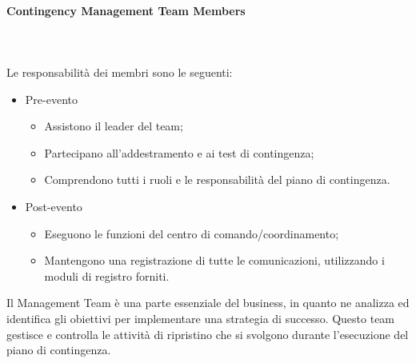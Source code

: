 \documentclass[12pt, a4paper, titlepage]{report}
\newcommand{\myparagraph}[1]{\paragraph{#1}\mbox{} \mbox{}}
\begin{document}
				\myparagraph{Contingency Management Team Members}\\
				\\Le responsabilità dei membri sono le seguenti:
				\begin{itemize}
					\item Pre-evento
					\begin{itemize}
						\item Assistono il leader del team;
						\item Partecipano all'addestramento e ai test di contingenza;
						\item Comprendono tutti i ruoli e le responsabilità del piano di contingenza.
					\end{itemize}
					\item Post-evento
					\begin{itemize}
						\item Eseguono le funzioni del centro di comando/coordinamento;
						\item Mantengono una registrazione di tutte le comunicazioni, utilizzando i moduli di registro forniti.
					\end{itemize}
				\end{itemize}
			
			Il Management Team è una parte essenziale del business, in quanto ne analizza ed identifica gli obiettivi per implementare una strategia di successo.  
			Questo team gestisce e controlla le attività di ripristino che si svolgono durante l'esecuzione del piano di contingenza.
			
\end{document}
